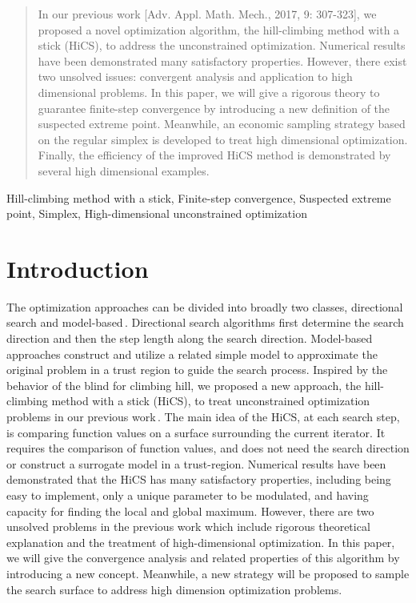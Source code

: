 \documentclass[final,1p,times]{elsarticle}
\begin{document}
\begin{frontmatter}
\begin{abstract}
In our previous work [Adv. Appl. Math. Mech., 2017, 9: 307-323],
we proposed a novel optimization algorithm, the hill-climbing
method with a stick (HiCS), to address the unconstrained optimization. Numerical
results have been demonstrated many satisfactory properties.
However, there exist two unsolved issues: convergent
analysis and application to high dimensional problems. 
In this paper, we will give a rigorous theory to guarantee finite-step
convergence by introducing a new definition of the suspected
extreme point. Meanwhile, an economic sampling
strategy based on the regular simplex is
developed to treat high dimensional optimization. Finally, 
the efficiency of the improved HiCS method is demonstrated by several
high dimensional examples.
\end{abstract}

\begin{keyword}
Hill-climbing method with a stick, Finite-step convergence,
Suspected extreme point, Simplex, 
High-dimensional unconstrained optimization
\end{keyword}

\end{frontmatter}


\section{Introduction}
\label{sec:intro}

The optimization approaches can be divided into broadly two
classes, directional search and
model-based\,\cite{sun2006optimization, nocedal2006numerical,
conn2009introduction}.
Directional search algorithms first determine the search
direction and then the step length along the search
direction. Model-based approaches construct and utilize a related simple
model to approximate the original problem in a trust region to
guide the search process. 
Inspired by the behavior of the blind for climbing hill, we
proposed a new approach, the hill-climbing method with a stick
(HiCS), to treat unconstrained optimization problems in
our previous work\,\cite{huang2017hill}.
The main idea of the HiCS, at each search step, is comparing
function values on a surface surrounding the current iterator.
It requires the comparison of function values, and
does not need the search direction or construct a surrogate
model in a trust-region.
Numerical results have been demonstrated that the HiCS has many 
satisfactory properties, including being easy to implement,
only a unique parameter to be modulated, and having capacity
for finding the local and global maximum. 
However, there are two unsolved problems in the
previous work which include rigorous theoretical explanation and
the treatment of high-dimensional optimization.
In this paper, we will give the convergence analysis and related
properties of this algorithm by introducing a new concept. 
Meanwhile, a new strategy will be proposed to sample the search
surface to address high dimension optimization problems.
\end{document}
